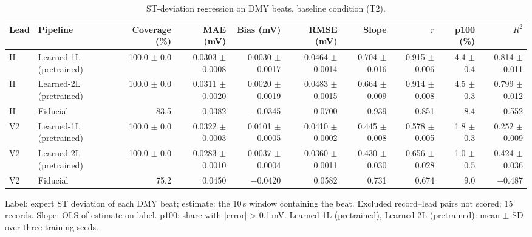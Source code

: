 \begin{table}[htbp]
\centering
\small
\caption{ST-deviation regression on DMY beats, baseline condition (T2).}
\label{tab:t2_regression_dmy}
\begin{tabular}{llrrrrrrrr}
\toprule
Lead & Pipeline & Coverage (\%) & MAE (mV) & Bias (mV) & RMSE (mV) & Slope & $r$ & p100 (\%) & $R^2$ \\
\midrule
II & Learned-1L (pretrained) & 100.0 $\pm$ 0.0 & 0.0303 $\pm$ 0.0008 & 0.0030 $\pm$ 0.0017 & 0.0464 $\pm$ 0.0014 & 0.704 $\pm$ 0.016 & 0.915 $\pm$ 0.006 & 4.4 $\pm$ 0.4 & 0.814 $\pm$ 0.011 \\
II & Learned-2L (pretrained) & 100.0 $\pm$ 0.0 & 0.0311 $\pm$ 0.0020 & 0.0020 $\pm$ 0.0019 & 0.0483 $\pm$ 0.0015 & 0.664 $\pm$ 0.009 & 0.914 $\pm$ 0.008 & 4.5 $\pm$ 0.3 & 0.799 $\pm$ 0.012 \\
II & Fiducial & 83.5 & 0.0382 & $-$0.0345 & 0.0700 & 0.939 & 0.851 & 8.4 & 0.552 \\
\midrule
V2 & Learned-1L (pretrained) & 100.0 $\pm$ 0.0 & 0.0322 $\pm$ 0.0003 & 0.0101 $\pm$ 0.0005 & 0.0410 $\pm$ 0.0002 & 0.445 $\pm$ 0.008 & 0.578 $\pm$ 0.005 & 1.8 $\pm$ 0.3 & 0.252 $\pm$ 0.009 \\
V2 & Learned-2L (pretrained) & 100.0 $\pm$ 0.0 & 0.0283 $\pm$ 0.0010 & 0.0037 $\pm$ 0.0004 & 0.0360 $\pm$ 0.0011 & 0.430 $\pm$ 0.030 & 0.656 $\pm$ 0.028 & 1.0 $\pm$ 0.5 & 0.424 $\pm$ 0.036 \\
V2 & Fiducial & 75.2 & 0.0450 & $-$0.0420 & 0.0582 & 0.731 & 0.674 & 9.0 & $-$0.487 \\
\bottomrule
\end{tabular}

\par\smallskip\footnotesize Label: expert ST deviation of each DMY beat; estimate: the 10\,s window containing the beat. Excluded record--lead pairs not scored; 15 records. Slope: OLS of estimate on label. p100: share with $|$error$|$ > 0.1\,mV. Learned-1L (pretrained), Learned-2L (pretrained): mean $\pm$ SD over three training seeds.
\end{table}
